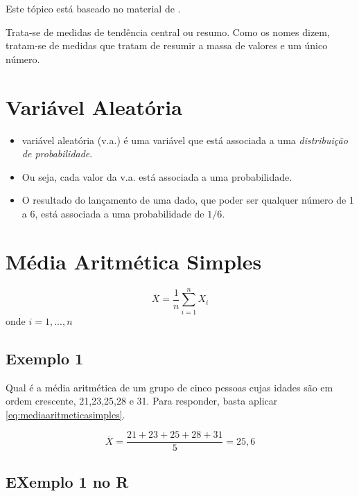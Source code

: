 \documentclass[
]{book}
\providecommand{\tightlist}{%
  \setlength{\itemsep}{0pt}\setlength{\parskip}{0pt}}
\begin{document}
Este tópico está baseado no material de \citet{Sartoris2013}.

Trata-se de medidas de tendência central ou resumo. Como os nomes dizem, tratam-se de medidas que tratam de resumir a massa de valores e um único número.

\hypertarget{variuxe1vel-aleatuxf3ria}{%
\section{Variável Aleatória}\label{variuxe1vel-aleatuxf3ria}}

\begin{itemize}
\tightlist
\item
  variável aleatória (v.a.) é uma variável que está associada a uma \emph{distribuição de probabilidade}.
\item
  Ou seja, cada valor da v.a. está associada a uma probabilidade.
\item
  O resultado do lançamento de uma dado, que poder ser qualquer número de 1 a 6, está associada a uma probabilidade de \(1/6\).
\end{itemize}

\hypertarget{muxe9dia-aritmuxe9tica-simples}{%
\section{Média Aritmética Simples}\label{muxe9dia-aritmuxe9tica-simples}}

\begin{equation}
    \overline{X} = \frac{1}{n} \sum_{i=1}^{n} X_i
    \label{eq:mediaaritmeticasimples}
\end{equation}
onde \(i =1, ...,n\)

\hypertarget{exemplo-1}{%
\subsection{Exemplo 1}\label{exemplo-1}}

Qual é a média aritmética de um grupo de cinco pessoas cujas idades são em ordem crescente, 21,23,25,28 e 31. Para responder, basta aplicar \eqref{eq:mediaaritmeticasimples}.

\begin{equation*}
  \overline{X} = \frac{21+23+25+28+31}{5} = 25,6
\end{equation*}

\hypertarget{exemplo-1-no-r}{%
\subsection{EXemplo 1 no R}\label{exemplo-1-no-r}}
\end{document}
